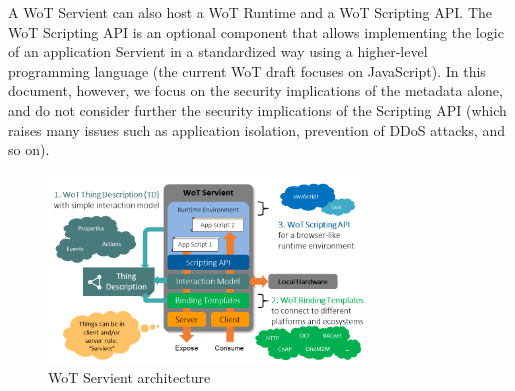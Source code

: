 A WoT Servient can also host a WoT Runtime and a WoT Scripting API.
The WoT Scripting API is an optional component that allows 
implementing the logic of an application Servient in a standardized way
using a higher-level programming language (the current WoT draft focuses on JavaScript). 
In this document, however, we focus on the security implications of the metadata alone,
and do not consider further the security implications of the Scripting API (which
raises many issues such as application isolation, prevention of DDoS attacks, and so on).

\begin{figure}[!t]
\centering
\includegraphics[width=3.3in]{figures/wot-servient.png}
\caption{WoT Servient architecture}
\label{fig-fservient}
\end{figure}


